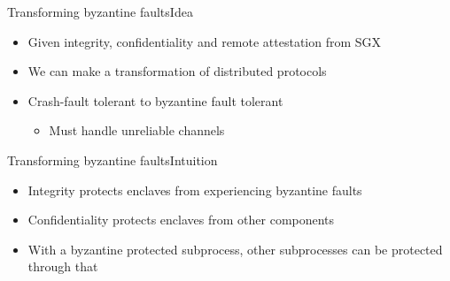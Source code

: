 \documentclass{beamer}
\begin{document}
\begin{frame}{Transforming byzantine faults}{Idea} %
  \begin{itemize}
  	\item Given integrity, confidentiality and remote attestation from SGX

  	\vfill

  	\item We can make a transformation of distributed protocols

  	\vfill

  	\item Crash-fault tolerant to byzantine fault tolerant
  	\begin{itemize}
  		\item Must handle unreliable channels
  	\end{itemize}
  \end{itemize}
\end{frame}

\begin{frame}{Transforming byzantine faults}{Intuition}
	\begin{itemize}
		\item Integrity protects enclaves from experiencing byzantine faults

  	\vfill

		\item Confidentiality protects enclaves from other components

  	\vfill

		\item With a byzantine protected subprocess, other subprocesses can be protected through that

	\end{itemize}
\end{frame}
\end{document}
